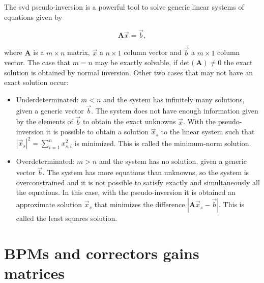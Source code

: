The \gls{svd} pseudo-inversion is a powerful tool to solve generic linear systems of equations given by

\begin{equation}
    \mathbf{A} \vec{x} = \vec{b},
    \label{eq:linear_system}
\end{equation}

where $\mathbf{A}$ is a $m \times n$ matrix, $\vec{x}$ a $n \times 1$ column vector and $\vec{b}$ a $m \times 1$ column vector. The case that $m=n$ may be exactly solvable, if $\mathrm{det}\left(\mathbf{A}\right) \neq 0$ the exact solution is obtained by normal inversion. Other two cases that may not have an exact solution occur:

\begin{itemize}
    \item Underdeterminated: $m < n$ and the system has infinitely many solutions, given a generic vector $\vec{b}$. The system does not have enough information given by the elements of $\vec{b}$ to obtain the exact unknowns $\vec{x}$. With the pseudo-inversion it is possible to obtain a solution $\vec{x}_s$ to the linear system such that $|\vec{x}_s|^2 = \sum_{i=1}^{n}x^2_{s, i}$ is minimized. This is called the minimum-norm solution.
    
    \item Overdeterminated: $m > n$ and the system has no solution, given a generic vector $\vec{b}$. The system has more equations than unknowns, so the system is overconstrained and it is not possible to satisfy exactly and simultaneously all the equations. In this case, with the pseudo-inversion it is obtained an approximate solution $\vec{x}_s$ that minimizes the difference $|\mathbf{A}\vec{x}_s - \vec{b}|$. This is called the least squares solution.
\end{itemize}









\chapter{BPMs and correctors gains matrices}\label{appendix:gains}